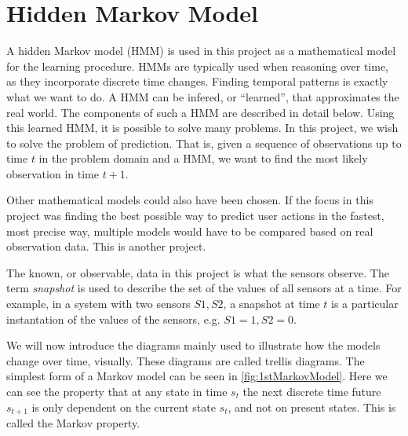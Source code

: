 \section{Hidden Markov Model}
A hidden Markov model (HMM) is used in this project as a mathematical model for the learning procedure. HMMs are typically used when reasoning over time, as they incorporate discrete time changes. Finding temporal patterns is exactly what we want to do. A HMM can be infered, or \enquote{learned}, that approximates the real world. The components of such a HMM are described in detail below. Using this learned HMM, it is possible to solve many problems. In this project, we wish to solve the problem of prediction. That is, given a sequence of observations up to time $t$ in the problem domain and a HMM, we want to find the most likely observation in time $t+1$.

Other mathematical models could also have been chosen. If the focus in this project was finding the best possible way to predict user actions in the fastest, most precise way, multiple models would have to be compared based on real observation data. This is another project.

The known, or observable, data in this project is what the sensors observe. The term \emph{snapshot} is used to describe the set of the values of all sensors at a time. For example, in a system with two sensors $S1,S2$, a snapshot at time $t$ is a particular instantation of the values of the sensors, e.g. $S1=1, S2=0$.

We will now introduce the diagrams mainly used to illustrate how the models change over time, visually. These diagrams are called trellis diagrams. The simplest form of a Markov model can be seen in \cref{fig:1stMarkovModel}. Here we can see the property that at any state in time $s_t$ the next discrete time future $s_{t+1}$ is only dependent on the current state $s_t$, and not on present states. This is called the Markov property. 

